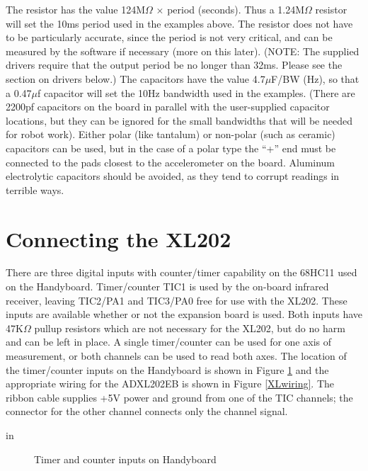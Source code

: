 The resistor has the value 124M$\Omega$ $\times$ period (seconds).  Thus a
1.24M$\Omega$ resistor will set the 10ms period used in the examples above.
The resistor does not have to be particularly accurate, since the
period is not very critical, and can be measured by the software if
necessary (more on this later).  (NOTE: The supplied drivers require
that the output period be no longer than 32ms.  Please see the section
on drivers below.)  The capacitors have the value 4.7$\mu$F/BW (Hz), so
that a 0.47$\mu$f capacitor will set the 10Hz bandwidth used in the
examples.  (There are 2200pf capacitors on the board in parallel with
the user-supplied capacitor locations, but they can be ignored for the
small bandwidths that will be needed for robot work).  Either polar
(like tantalum) or non-polar (such as ceramic) capacitors can be used,
but in the case of a polar type the ``+'' end must be connected to the
pads closest to the accelerometer on the board.  Aluminum electrolytic
capacitors should be avoided, as they tend to corrupt readings in
terrible ways.

\section{Connecting the XL202}

There are three digital inputs with counter/timer capability on the
68HC11 used on the Handyboard.  Timer/counter TIC1 is used by the
on-board infrared receiver, leaving TIC2/PA1 and TIC3/PA0 free for use
with the XL202.  These inputs are available whether or not the
expansion board is used.  Both inputs have 47K$\Omega$ pullup resistors
which are not necessary for the XL202, but do no harm and can be left
in place.  A single timer/counter can be used for one axis of
measurement, or both channels can be used to read both axes.  The
location of the timer/counter inputs on the Handyboard is shown in
Figure \ref{HBinput} and the appropriate wiring for the ADXL202EB is shown in
Figure \ref{XLwiring}.  The ribbon cable supplies +5V power and ground from one of
the TIC channels; the connector for the other channel connects only
the channel signal.

 in
\begin{figure}[htbp]
\begin{center}
\caption{Timer and counter inputs on Handyboard}
\label{HBinput}
\end{center}
\end{figure}

